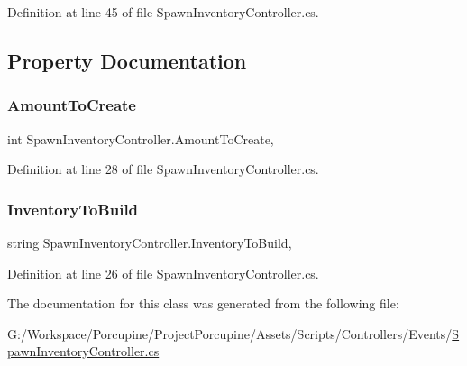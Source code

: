 Definition at line 45 of file Spawn\+Inventory\+Controller.\+cs.



\subsection{Property Documentation}
\mbox{\label{class_spawn_inventory_controller_a93e88f3a636946c165bccf1c4dfbafb8}} 
\subsubsection{\texorpdfstring{Amount\+To\+Create}{AmountToCreate}}
{\footnotesize\ttfamily int Spawn\+Inventory\+Controller.\+Amount\+To\+Create\hspace{0.3cm}{\ttfamily [get]}, {}}



Definition at line 28 of file Spawn\+Inventory\+Controller.\+cs.

\mbox{\label{class_spawn_inventory_controller_afec19a2cf637db46f26769dc33b89782}} 
\subsubsection{\texorpdfstring{Inventory\+To\+Build}{InventoryToBuild}}
{\footnotesize\ttfamily string Spawn\+Inventory\+Controller.\+Inventory\+To\+Build\hspace{0.3cm}{\ttfamily [get]}, {}}



Definition at line 26 of file Spawn\+Inventory\+Controller.\+cs.



The documentation for this class was generated from the following file\+:\begin{DoxyCompactItemize}
\item 
G\+:/\+Workspace/\+Porcupine/\+Project\+Porcupine/\+Assets/\+Scripts/\+Controllers/\+Events/\hyperlink{_spawn_inventory_controller_8cs}{Spawn\+Inventory\+Controller.\+cs}\end{DoxyCompactItemize}
